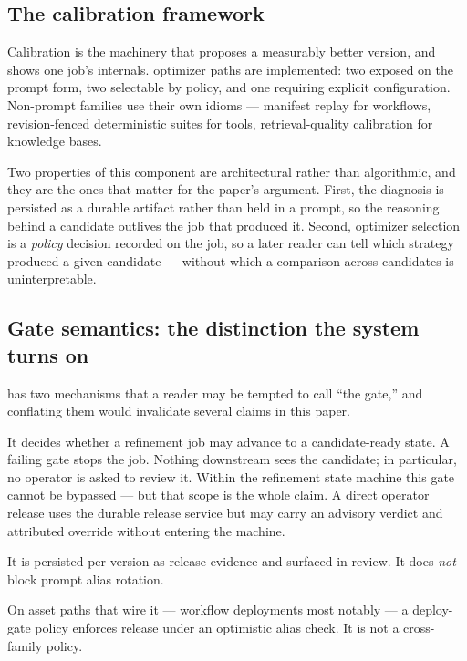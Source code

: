 \subsection{The calibration framework}



Calibration is the machinery that proposes a measurably better version, and
 shows one job's internals. \statOptimizersC{} optimizer
paths are implemented: two exposed on the prompt form, two selectable by policy, and one
requiring explicit configuration. Non-prompt families use their own idioms ---
manifest replay for workflows, revision-fenced deterministic suites for tools,
retrieval-quality calibration for knowledge bases.

Two properties of this component are architectural rather than algorithmic, and
they are the ones that matter for the paper's argument. First, the diagnosis is
persisted as a durable artifact rather than held in a prompt, so the reasoning
behind a candidate outlives the job that produced it. Second, optimizer selection is
a \emph{policy} decision recorded on the job, so a later reader can tell which
strategy produced a given candidate --- without which a comparison across candidates
is uninterpretable.

\subsection{Gate semantics: the distinction the system turns on}



\sys has two mechanisms that a reader may be tempted to call ``the gate,'' and
conflating them would invalidate several claims in this paper.

 It decides whether a refinement job may advance
to a candidate-ready state. A failing gate stops the job. Nothing downstream sees
the candidate; in particular, no operator is asked to review it. Within the
refinement state machine this gate cannot be bypassed --- but that scope is the
whole claim. A direct operator release uses the durable release service but may
carry an advisory verdict and attributed override without entering the machine.

 It is persisted per version as release
evidence and surfaced in review. It does \emph{not} block prompt alias rotation.

 On asset paths that wire it --- workflow
deployments most notably --- a deploy-gate policy enforces release under an
optimistic alias check. It is not a cross-family policy.

